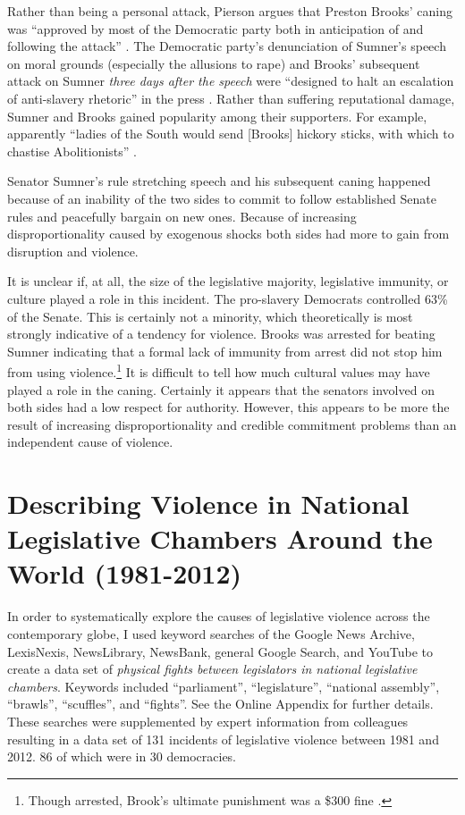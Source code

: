 \documentclass[a4paper]{article}\usepackage[]{graphicx}\usepackage[]{color}
\begin{document}
Rather than being a personal attack, Pierson argues that Preston Brooks' caning was ``approved by most of the Democratic party both in anticipation of and following the attack'' \cite[553]{Pierson1995}. The Democratic party's denunciation of Sumner's speech on moral grounds (especially the allusions to rape) and Brooks' subsequent attack on Sumner \emph{three days after the speech} were ``designed to halt an escalation of anti-slavery rhetoric'' in the press \cite[553]{Pierson1995}. Rather than suffering reputational damage, Sumner and Brooks gained popularity among their supporters. For example, apparently ``ladies of the South would send [Brooks] hickory sticks, with which to chastise Abolitionists'' \cite[255]{Donald2009}.

Senator Sumner's rule stretching speech and his subsequent caning happened because of an inability of the two sides to commit to follow established Senate rules and peacefully bargain on new ones. Because of increasing disproportionality caused by exogenous shocks both sides had more to gain from disruption and violence.

It is unclear if, at all, the size of the legislative majority, legislative immunity, or culture played a role in this incident. The pro-slavery Democrats controlled 63\% of the Senate. This is certainly not a minority, which theoretically is most strongly indicative of a tendency for violence. Brooks was arrested for beating Sumner indicating that a formal lack of immunity from arrest did not stop him from using violence.\footnote{Though arrested, Brook's ultimate punishment was a \$300 fine \cite[59]{Wolfe2004}.} It is difficult to tell how much cultural values may have played a role in the caning. Certainly it appears that the senators involved on both sides had a low respect for authority. However, this appears to be more the result of increasing disproportionality and credible commitment problems than an independent cause of violence.

\section*{Describing Violence in National Legislative Chambers Around the World (1981-2012)}

In order to systematically explore the causes of legislative violence across the contemporary globe, I used keyword searches of the Google News Archive, LexisNexis, NewsLibrary, NewsBank, general Google Search, and YouTube to create a data set of {\emph{physical fights between legislators in national legislative chambers}}. Keywords included ``parliament'', ``legislature'', ``national assembly'', ``brawls'', ``scuffles'', and ``fights''. See the Online Appendix for further details. These searches were supplemented by expert information from colleagues resulting in a data set of 131 incidents of legislative violence between 1981 and 2012. 86 of which were in 30 democracies.
\end{document}
